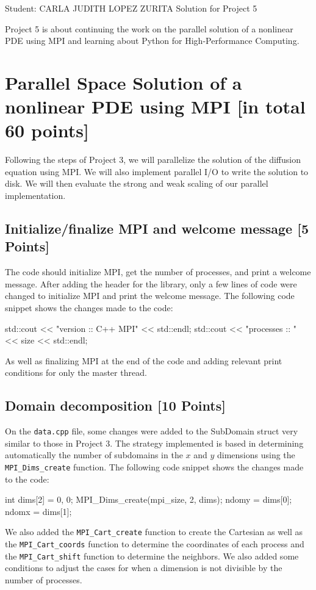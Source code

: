 \documentclass[unicode,11pt,a4paper,oneside,numbers=endperiod,openany]{scrartcl}
\begin{document}
\setassignment
{}

            {Student: CARLA JUDITH LOPEZ ZURITA}
            { }{Solution for Project 5}{}
\newline


Project 5 is about continuing the work on the parallel solution of a nonlinear
PDE using MPI and learning about Python for High-Performance Computing.

\section{Parallel Space Solution of a nonlinear PDE using MPI
         [in total 60 points]}
Following the steps of Project 3, we will parallelize the solution of the
diffusion equation using MPI. We will also implement parallel I/O to write
the solution to disk. We will then evaluate the strong and weak scaling of
our parallel implementation.
\subsection{Initialize/finalize MPI and welcome message [5 Points]}
The code should initialize MPI, get the number of processes, and print a welcome
message. After adding the header for the library, only a few lines of code were changed to initialize MPI and print the welcome message. The following code snippet shows the changes made to the code:
\begin{cppverbatim}
std::cout << "version   :: C++ MPI" << std::endl;
std::cout << "processes :: " << size << std::endl;
\end{cppverbatim}
As well as finalizing MPI at the end of the code and adding relevant print
conditions for only the master thread.
\subsection{Domain decomposition [10 Points]}

On the \texttt{data.cpp} file, some changes were added to the SubDomain struct
very similar to those in Project 3.  The
strategy implemented is based in determining automatically the number of
subdomains in the $x$ and $y$ dimensions using the \texttt{MPI\_Dims\_create}
function. The following code snippet shows the changes made to the code:
\begin{cppverbatim}
int dims[2] = {0, 0};
MPI_Dims_create(mpi_size, 2, dims);
ndomy = dims[0];
ndomx = dims[1];
\end{cppverbatim}
We also added the \texttt{MPI\_Cart\_create} function to create the Cartesian as
well as the \texttt{MPI\_Cart\_coords} function to determine the coordinates of
each process and the \texttt{MPI\_Cart\_shift} function to determine the neighbors.
We also added some conditions to adjust the
cases for when a dimension is not divisible by the number of processes.
\end{document}
